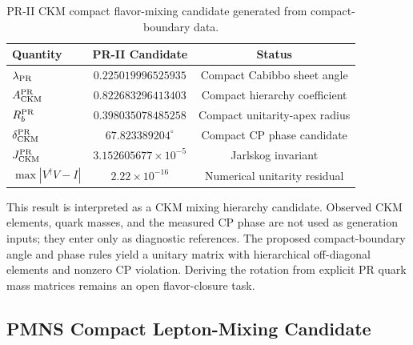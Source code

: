 \documentclass[11pt]{article}
\renewcommand{\arraystretch}{1.22}
\renewcommand{\arraystretch}{1.4}
\begin{document}
\begin{table}[ht!]
\centering
\caption{PR-II CKM compact flavor-mixing candidate generated from compact-boundary data.}
\label{tab:pr2_ckm_candidate_main}
\small
\renewcommand{\arraystretch}{1.25}
\begin{tabular}{lcc}
\hline\hline
\textbf{Quantity} & \textbf{PR-II Candidate} & \textbf{Status} \\ \hline
\(\lambda_{\rm PR}\) 
& \(0.225019996525935\) 
& Compact Cabibbo sheet angle \\

\(A_{\rm CKM}^{\rm PR}\) 
& \(0.822683296413403\) 
& Compact hierarchy coefficient \\

\(R_b^{\rm PR}\) 
& \(0.398035078485258\) 
& Compact unitarity-apex radius \\

\(\delta_{\rm CKM}^{\rm PR}\) 
& \(67.823389204^\circ\) 
& Compact CP phase candidate \\

\(J_{\rm CKM}^{\rm PR}\) 
& \(3.152605677\times10^{-5}\) 
& Jarlskog invariant \\

\(\max|V^\dagger V-I|\) 
& \(2.22\times10^{-16}\) 
& Numerical unitarity residual \\ \hline\hline
\end{tabular}
\end{table}

This result is interpreted as a CKM mixing hierarchy candidate. Observed CKM elements, quark masses, and the measured CP phase are not used as generation inputs; they enter only as diagnostic references. The proposed compact-boundary angle and phase rules yield a unitary matrix with hierarchical off-diagonal elements and nonzero CP violation. Deriving the rotation from explicit PR quark mass matrices remains an open flavor-closure task.

\subsection{PMNS Compact Lepton-Mixing Candidate}
\label{sec:pr2_pmns_compact_lepton_mixing_candidate}
\end{document}
